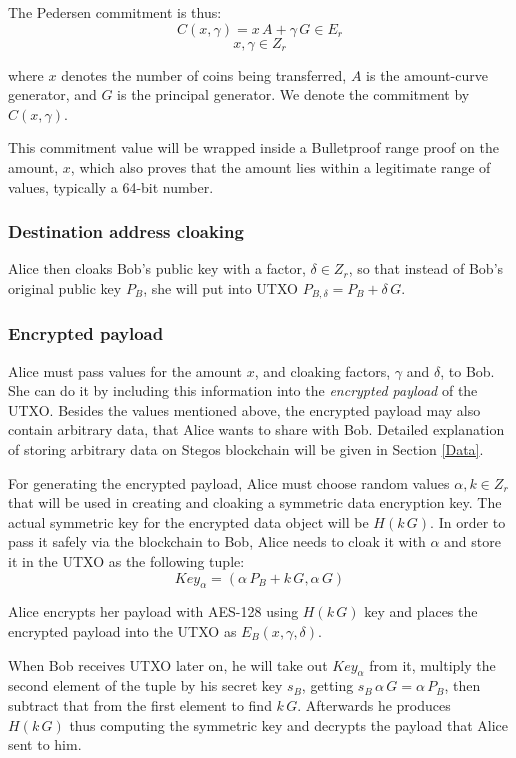 \documentclass[8pt,fleqn,openany]{book}
\begin{document}
The Pedersen commitment is thus:
$$ C(x, \gamma) = x \, A + \gamma \, G \in E_r$$
$$x, \gamma \in Z_r$$

where $x$ denotes the number of coins being transferred, $A$ is the amount-curve generator, and $G$ is the principal generator. We denote the commitment by $C(x, \gamma)$. 

This commitment value will be wrapped inside a Bulletproof range proof on the amount, $x$, which also proves that the amount lies within a legitimate range of values, typically a 64-bit number.

\subsubsection{Destination address cloaking} Alice then cloaks Bob’s public key with a factor, $\delta \in Z_r$, so that instead of Bob’s original public key $P_B$, she will put into UTXO $P_{B, \delta} = P_B + \delta \, G$.


\subsubsection{Encrypted payload} Alice must pass values for the amount $x$, and cloaking factors, $\gamma$ and $\delta$, to Bob. She can do it by including this information into the \textit{encrypted payload} of the UTXO. Besides the values mentioned above, the encrypted payload may also contain arbitrary data, that Alice wants to share with Bob. Detailed explanation of storing arbitrary data on Stegos blockchain will be given in Section \ref{Data}. 

For generating the encrypted payload, Alice must choose random values $\alpha, k \in Z_r$ that will be used in creating and cloaking a symmetric data encryption key.
The actual symmetric key for the encrypted data object will be $H(k \, G)$. In order to pass it safely via the blockchain to Bob, Alice needs to cloak it with $\alpha$ and store it in the UTXO as the following tuple: $$\mathit{Key}_{\alpha} = (\alpha \, P_{B} + k \, G, \alpha \, G )$$ 

Alice encrypts her payload with AES-128 using $H(k \, G)$ key and places the encrypted payload into the UTXO as $E_B(x, \gamma, \delta)$.

When Bob receives UTXO later on, he will take out $\mathit{Key}_{\alpha}$ from it, multiply the second element of the tuple by his secret key $s_B$, getting $s_B \, \alpha \, G = \alpha \, P_B$, then subtract that from the first element to find $k \, G$. Afterwards he produces $H(k \, G)$ thus computing the symmetric key and decrypts the payload that Alice sent to him.
\end{document}
